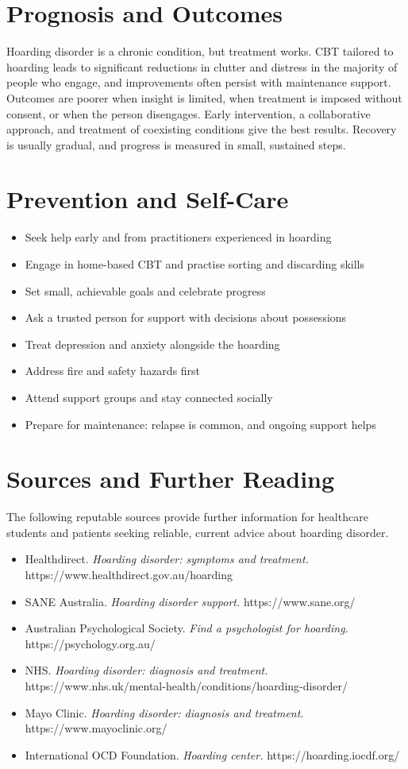 \section*{Prognosis and Outcomes}
Hoarding disorder is a chronic condition, but treatment works. CBT tailored to hoarding leads to significant reductions in clutter and distress in the majority of people who engage, and improvements often persist with maintenance support. Outcomes are poorer when insight is limited, when treatment is imposed without consent, or when the person disengages. Early intervention, a collaborative approach, and treatment of coexisting conditions give the best results. Recovery is usually gradual, and progress is measured in small, sustained steps.

\section*{Prevention and Self-Care}
\begin{itemize}
    \item Seek help early and from practitioners experienced in hoarding
    \item Engage in home-based CBT and practise sorting and discarding skills
    \item Set small, achievable goals and celebrate progress
    \item Ask a trusted person for support with decisions about possessions
    \item Treat depression and anxiety alongside the hoarding
    \item Address fire and safety hazards first
    \item Attend support groups and stay connected socially
    \item Prepare for maintenance: relapse is common, and ongoing support helps
\end{itemize}

\section*{Sources and Further Reading}
The following reputable sources provide further information for healthcare students and patients seeking reliable, current advice about hoarding disorder.

\begin{itemize}
    \item Healthdirect. \textit{Hoarding disorder: symptoms and treatment.} https://www.healthdirect.gov.au/hoarding
    \item SANE Australia. \textit{Hoarding disorder support.} https://www.sane.org/
    \item Australian Psychological Society. \textit{Find a psychologist for hoarding.} https://psychology.org.au/
    \item NHS. \textit{Hoarding disorder: diagnosis and treatment.} https://www.nhs.uk/mental-health/conditions/hoarding-disorder/
    \item Mayo Clinic. \textit{Hoarding disorder: diagnosis and treatment.} https://www.mayoclinic.org/
    \item International OCD Foundation. \textit{Hoarding center.} https://hoarding.iocdf.org/
\end{itemize}
